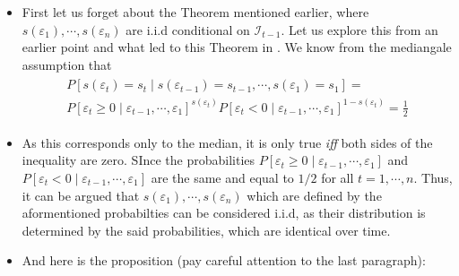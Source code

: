 \documentclass{beamer}
\begin{document}
\begin{frame}
\begin{itemize}
\item{} First let us forget about the Theorem mentioned earlier, where $s(\varepsilon_1),\cdots, s(\varepsilon_n)$ are i.i.d conditional on $\mathcal{I}_{t-1}$. Let us explore this from an earlier point and what led to this Theorem in . We know from the mediangale assumption that
\begin{align*}
\begin{array}{l}
P[s(\varepsilon_t)=s_t\mid s(\varepsilon_{t-1})=s_{t-1},\cdots,s(\varepsilon_{1})=s_{1}]=\\
P[\varepsilon_t\geq0\mid \varepsilon_{t-1},\cdots,\varepsilon_{1}]^{s(\varepsilon_t)}
P[\varepsilon_t<0\mid \varepsilon_{t-1},\cdots,\varepsilon_{1}]^{1-s(\varepsilon_t)}=\frac{1}{2}
\end{array}
\end{align*}
\item{} As this corresponds only to the median, it is only true \textit{iff} both sides of the inequality are zero. SInce the probabilities $P[\varepsilon_t\geq0\mid \varepsilon_{t-1},\cdots,\varepsilon_{1}]$ and $P[\varepsilon_t<0\mid \varepsilon_{t-1},\cdots,\varepsilon_{1}]$ are the same and equal to $1/2$ for all $t=1,\cdots,n$. Thus, it can be argued that $s(\varepsilon_1),\cdots,s(\varepsilon_n)$ which are defined by the aformentioned probabilties can be considered i.i.d, as their distribution is determined by the said probabilities, which are identical over time.
\end{itemize}
\end{frame}

\begin{frame}
\begin{itemize}
\item{} And here is the proposition (pay careful attention to the last paragraph):
\end{itemize}
\end{frame}
\end{document}
